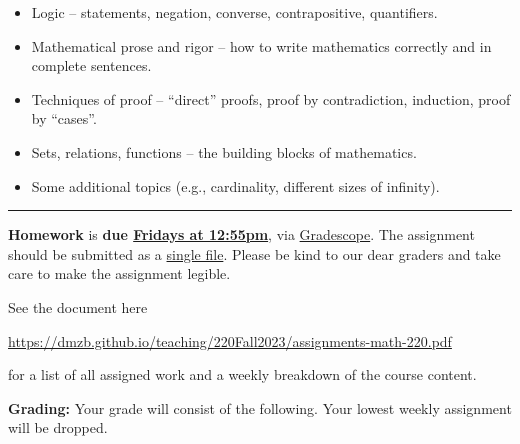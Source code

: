 \documentclass[12pt]{article}
\begin{document}
\begin{itemize}
\item Logic -- statements, negation, converse, contrapositive, quantifiers. \vspace{-5pt}
\item Mathematical prose and rigor -- how to write mathematics
  correctly and in complete sentences.\vspace{-5pt}
\item Techniques of proof -- ``direct'' proofs, proof by contradiction, induction, proof by ``cases''. \vspace{-5pt}
\item Sets, relations, functions -- the building blocks of mathematics. \vspace{-5pt}
\item Some additional topics (e.g., cardinality, different sizes of infinity).
\end{itemize}


\hrule
\medskip

\noindent \textbf{Homework} is \textbf{due \underline{Fridays at 12:55pm}}, via \underline{Gradescope}. The assignment should be submitted as a \underline{single file}. Please be kind to our dear graders and take care to make the assignment legible.
\smallskip

\noindent See the document here
\begin{center}
  \url{https://dmzb.github.io/teaching/220Fall2023/assignments-math-220.pdf}
\end{center}
for a list of all assigned work and a weekly breakdown of the course content.
\medskip






\noindent\textbf{Grading:} 
Your grade will consist of the following. Your lowest weekly assignment will be dropped.
\end{document}
